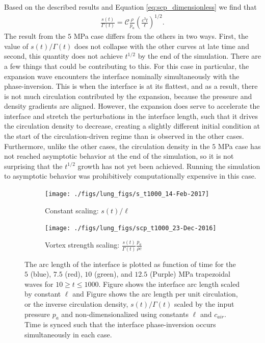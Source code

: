 \documentclass{jfm}%
\begin{document}
Based on the described results and Equation \eqref{eq:scp_dimensionless} we find that 
\begin{align}
  \label{eq:scp_relationship}
  \frac{s(t)}{\Gamma(t)} = \mathcal{C}\frac{\rho}{p_a}\left(\frac{c^3t}{\ell}\right)^{1/2}.
\end{align}
The result from the $5$ MPa case differs from the others in
two ways. First, the value of $s(t)/\Gamma(t)$ does not collapse with
the other curves at late time and second, this quantity does not
achieve $t^{1/2}$ by the end of the simulation. There are a few things
that could be contributing to this. For this case in particular, the
expansion wave encounters the interface nominally simultaneously with
the phase-inversion. This is when the interface is at its flattest,
and as a result, there is not much circulation contributed by the
expansion, because the pressure and density gradients are
aligned. However, the expansion does serve to accelerate the interface
and stretch the perturbations in the interface length, such that it
drives the circulation density to decrease, creating a slightly
different initial condition at the start of the circulation-driven
regime than is observed in the other cases. Furthermore, unlike the
other cases, the circulation density in the $5$ MPa case has not
reached asymptotic behavior at the end of the simulation, so it is not
surprising that the $t^{1/2}$ growth has not yet been
achieved. Running the simulation to asymptotic behavior was
prohibitively computationally expensive in this case.

\begin{figure}
  \centering
  \begin{subfigure}{0.45\textwidth}
    \texttt{[image: ./figs/lung\_figs/s\_t1000\_14-Feb-2017]}
    \caption{\label{fig:trapz_scp_t1000_unscaled} Constant scaling: $s(t)/\ell$}
  \end{subfigure}
  \begin{subfigure}{0.45\textwidth}
    \texttt{[image: ./figs/lung\_figs/scp\_t1000\_23-Dec-2016]}
    \caption{\label{fig:trapz_scp_t1000_scaled} Vortex strength scaling: $\frac{s(t)}{\Gamma(t)} \frac{p_a}{\rho c}$}
  \end{subfigure}
  \caption[The interface arc length at long times]{The arc length of
    the interface is plotted as function of time for the $5$ (blue),
    $7.5$ (red), $10$ (green), and $12.5$ (Purple) MPa trapezoidal
    waves for $10\geq t\leq 1000$. Figure
     shows the interface arc
    length scaled by constant $\ell$ and Figure
     shows the arc length per unit
    circulation, or the inverse circulation density, $s(t)/\Gamma(t)$
    scaled by the input pressure $p_a$ and non-dimensionalized using
    constants $\ell$ and $c_{air}$. Time is synced such that the
    interface phase-inversion occurs simultaneously in each case.}
  \label{fig:trapz_scp_t1000}
\end{figure}
% 
\end{document}
